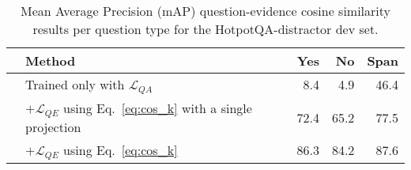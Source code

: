 \begin{table}[t]
\centering
\footnotesize
\setlength{\tabcolsep}{3pt} 
        \begin{tabular}[b]{@{}clrrr@{}}
            \toprule
            &Method            & Yes & No & Span \\ \midrule
            &Trained only with $\mathcal{L}_{QA}$ & 8.4   & 4.9    & 46.4     \\ 
            & $+\mathcal{L}_{QE}$ using Eq.~\ref{eq:cos_k} with a single projection & 72.4 & 65.2 & 77.5\\
            &$+\mathcal{L}_{QE}$ using Eq.~\ref{eq:cos_k} & 86.3 & 84.2 & 87.6\\
            \bottomrule
        \end{tabular}
\caption{Mean Average Precision (mAP) question-evidence cosine similarity results per question type for the HotpotQA-distractor dev set.} 
\label{tab:map}
\end{table}